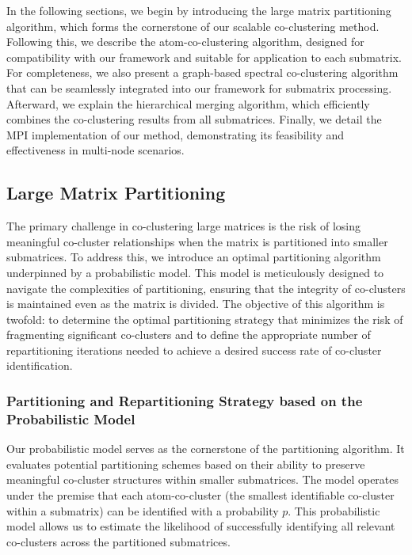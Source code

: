 \documentclass[journal]{IEEEtran}
\begin{document}
In the following sections, we begin by introducing the large matrix partitioning algorithm, which forms the cornerstone of our scalable co-clustering method. Following this, we describe the atom-co-clustering algorithm, designed for compatibility with our framework and suitable for application to each submatrix. For completeness, we also present a graph-based spectral co-clustering algorithm that can be seamlessly integrated into our framework for submatrix processing. Afterward, we explain the hierarchical merging algorithm, which efficiently combines the co-clustering results from all submatrices. Finally, we detail the MPI implementation of our method, demonstrating its feasibility and effectiveness in multi-node scenarios.

\subsection{Large Matrix Partitioning}

The primary challenge in co-clustering large matrices is the risk of losing meaningful co-cluster relationships when the matrix is partitioned into smaller submatrices. To address this, we introduce an optimal partitioning algorithm underpinned by a probabilistic model. This model is meticulously designed to navigate the complexities of partitioning, ensuring that the integrity of co-clusters is maintained even as the matrix is divided. The objective of this algorithm is twofold: to determine the optimal partitioning strategy that minimizes the risk of fragmenting significant co-clusters and to define the appropriate number of repartitioning iterations needed to achieve a desired success rate of co-cluster identification.

\subsubsection{Partitioning and Repartitioning Strategy based on the Probabilistic Model}

Our probabilistic model serves as the cornerstone of the partitioning algorithm. It evaluates potential partitioning schemes based on their ability to preserve meaningful co-cluster structures within smaller submatrices. The model operates under the premise that each atom-co-cluster (the smallest identifiable co-cluster within a submatrix) can be identified with a probability $p$. This probabilistic model allows us to estimate the likelihood of successfully identifying all relevant co-clusters across the partitioned submatrices.
\end{document}
